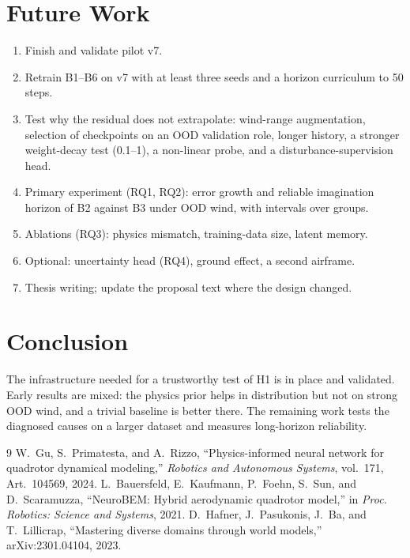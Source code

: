 \documentclass[conference]{IEEEtran}
\begin{document}
\section{Future Work}
\begin{enumerate}
\item Finish and validate pilot v7.
\item Retrain B1--B6 on v7 with at least three seeds and a horizon curriculum to 50 steps.
\item Test why the residual does not extrapolate: wind-range augmentation, selection of checkpoints on an OOD validation role, longer history, a stronger weight-decay test (0.1--1), a non-linear probe, and a disturbance-supervision head.
\item Primary experiment (RQ1, RQ2): error growth and reliable imagination horizon of B2 against B3 under OOD wind, with intervals over groups.
\item Ablations (RQ3): physics mismatch, training-data size, latent memory.
\item Optional: uncertainty head (RQ4), ground effect, a second airframe.
\item Thesis writing; update the proposal text where the design changed.
\end{enumerate}

\section{Conclusion}
The infrastructure needed for a trustworthy test of H1 is in place and validated. Early results are mixed: the physics prior helps in distribution but not on strong OOD wind, and a trivial baseline is better there. The remaining work tests the diagnosed causes on a larger dataset and measures long-horizon reliability.

\begin{thebibliography}{9}
 W.~Gu, S.~Primatesta, and A.~Rizzo, ``Physics-informed neural network for quadrotor dynamical modeling,'' \emph{Robotics and Autonomous Systems}, vol.~171, Art.~104569, 2024.
 L.~Bauersfeld, E.~Kaufmann, P.~Foehn, S.~Sun, and D.~Scaramuzza, ``NeuroBEM: Hybrid aerodynamic quadrotor model,'' in \emph{Proc. Robotics: Science and Systems}, 2021.
 D.~Hafner, J.~Pasukonis, J.~Ba, and T.~Lillicrap, ``Mastering diverse domains through world models,'' arXiv:2301.04104, 2023.
\end{thebibliography}
\end{document}
